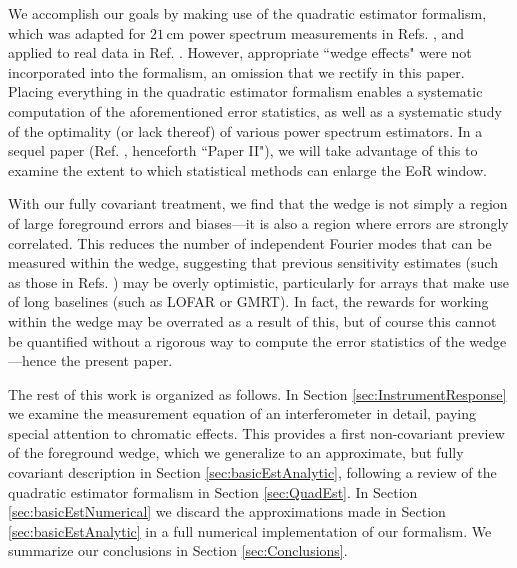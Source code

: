 \documentclass[twocolumn,aps,prd,nofootinbib,showpacs]{revtex4-1}
\begin{document}
We accomplish our goals by making use of the quadratic estimator formalism, which was adapted for $21\,\textrm{cm}$ power spectrum measurements in Refs. \cite{Liu2011,Dillon2013}, and applied to real data in Ref. \cite{Dillon2014}.  However, appropriate ``wedge effects" were not incorporated into the formalism, an omission that we rectify in this paper.  Placing everything in the quadratic estimator formalism enables a systematic computation of the aforementioned error statistics, as well as a systematic study of the optimality (or lack thereof) of various power spectrum estimators.  In a sequel paper (Ref. \cite{Liu2014b}, henceforth ``Paper II"), we will take advantage of this to examine the extent to which statistical methods can enlarge the EoR window.

With our fully covariant treatment, we find that the wedge is not simply a region of large foreground errors and biases---it is also a region where errors are strongly correlated.  This reduces the number of independent Fourier modes that can be measured within the wedge, suggesting that previous sensitivity estimates (such as those in Refs. \cite{Parsons2012a,Beardsley2013,Pober2014}) may be overly optimistic, particularly for arrays that make use of long baselines (such as LOFAR or GMRT).  In fact, the rewards for working within the wedge may be overrated as a result of this, but of course this cannot be quantified without a rigorous way to compute the error statistics of the wedge---hence the present paper.

The rest of this work is organized as follows.  In Section \ref{sec:InstrumentResponse} we examine the measurement equation of an interferometer in detail, paying special attention to chromatic effects.  This provides a first non-covariant preview of the foreground wedge, which we generalize to an approximate, but fully covariant description in Section \ref{sec:basicEstAnalytic}, following a review of the quadratic estimator formalism in Section \ref{sec:QuadEst}.  In Section \ref{sec:basicEstNumerical} we discard the approximations made in Section \ref{sec:basicEstAnalytic} in a full numerical implementation of our formalism.  We summarize our conclusions in Section \ref{sec:Conclusions}.
\end{document}
